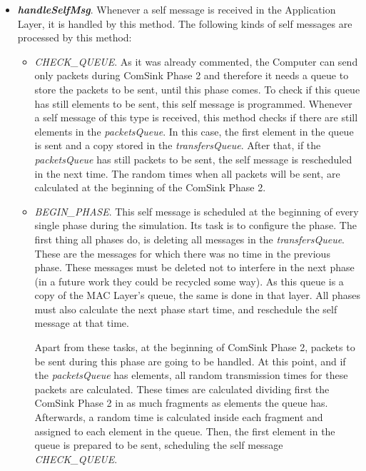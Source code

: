 \begin{itemize}
  \item \textbf{\textit{handleSelfMsg}}. Whenever a self message is received in the Application Layer, it is handled by this method. The following 
  kinds of self messages are processed by this method:
  \begin{itemize}
    \item \textit{CHECK\_QUEUE}. As it was already commented, the Computer can send only packets during ComSink Phase 2 and therefore it needs a 
    queue to store the packets to be sent, until this phase comes. To check if this queue has still elements to be sent, this self message is programmed.
    Whenever a self message of this type is received, this method checks if there are still elements in the \textit{packetsQueue}. In this case,
    the first element in the queue is sent and a copy stored in the \textit{transfersQueue}. After that, if the \textit{packetsQueue} has still
    packets to be sent, the self message is rescheduled in the next time. The random times when all packets will be sent, are calculated at the
    beginning of the ComSink Phase 2.

    \item \textit{BEGIN\_PHASE}. This self message is scheduled at the beginning of every single phase during the simulation. Its task is to 
    configure the phase. The first thing all phases do, is deleting all messages in the \textit{transfersQueue}. These are the messages for which 
    there was no time in the previous phase. These messages must be deleted not to interfere in the next phase (in a future work they could be 
    recycled some way). As this queue is a copy of the \ac{MAC} Layer's queue, the same is done in that layer. All phases must also calculate the 
    next phase start time, and reschedule the self message at that time.

    Apart from these tasks, at the beginning of ComSink Phase 2, packets to be sent during this phase are going to be handled. At this point, and 
    if the \textit{packetsQueue} has elements, all random transmission times for these packets are calculated. These times are calculated dividing 
    first the ComSink Phase 2 in as much fragments as elements the queue has. Afterwards, a random time is calculated inside each fragment and
    assigned to each element in the queue. Then, the first element in the queue is prepared to be sent, scheduling the self message 
    \textit{CHECK\_QUEUE}.
  \end{itemize}
\end{itemize}


